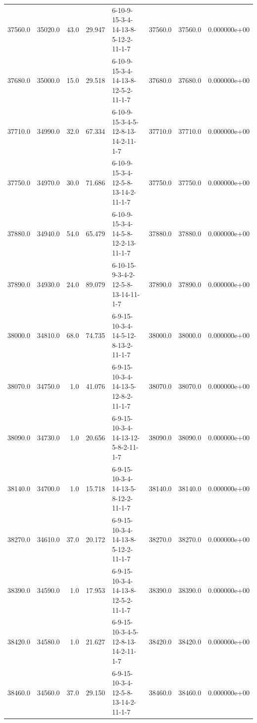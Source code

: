 \begin{tabular}{rrrrlrrr}
 37560.0 &  35020.0 &           43.0 &             29.947 &  6-10-9-15-3-4-14-13-8-5-12-2-11-1-7 &       37560.0 &         37560.0 &  0.000000e+00 \\
 37680.0 &  35000.0 &           15.0 &             29.518 &  6-10-9-15-3-4-14-13-8-12-5-2-11-1-7 &       37680.0 &         37680.0 &  0.000000e+00 \\
 37710.0 &  34990.0 &           32.0 &             67.334 &  6-10-9-15-3-4-5-12-8-13-14-2-11-1-7 &       37710.0 &         37710.0 &  0.000000e+00 \\
 37750.0 &  34970.0 &           30.0 &             71.686 &  6-10-9-15-3-4-12-5-8-13-14-2-11-1-7 &       37750.0 &         37750.0 &  0.000000e+00 \\
 37880.0 &  34940.0 &           54.0 &             65.479 &  6-10-9-15-3-4-14-5-8-12-2-13-11-1-7 &       37880.0 &         37880.0 &  0.000000e+00 \\
 37890.0 &  34930.0 &           24.0 &             89.079 &  6-10-15-9-3-4-2-12-5-8-13-14-11-1-7 &       37890.0 &         37890.0 &  0.000000e+00 \\
 38000.0 &  34810.0 &           68.0 &             74.735 &  6-9-15-10-3-4-14-5-12-8-13-2-11-1-7 &       38000.0 &         38000.0 &  0.000000e+00 \\
 38070.0 &  34750.0 &            1.0 &             41.076 &  6-9-15-10-3-4-14-13-5-12-8-2-11-1-7 &       38070.0 &         38070.0 &  0.000000e+00 \\
 38090.0 &  34730.0 &            1.0 &             20.656 &  6-9-15-10-3-4-14-13-12-5-8-2-11-1-7 &       38090.0 &         38090.0 &  0.000000e+00 \\
 38140.0 &  34700.0 &            1.0 &             15.718 &  6-9-15-10-3-4-14-13-5-8-12-2-11-1-7 &       38140.0 &         38140.0 &  0.000000e+00 \\
 38270.0 &  34610.0 &           37.0 &             20.172 &  6-9-15-10-3-4-14-13-8-5-12-2-11-1-7 &       38270.0 &         38270.0 &  0.000000e+00 \\
 38390.0 &  34590.0 &            1.0 &             17.953 &  6-9-15-10-3-4-14-13-8-12-5-2-11-1-7 &       38390.0 &         38390.0 &  0.000000e+00 \\
 38420.0 &  34580.0 &            1.0 &             21.627 &  6-9-15-10-3-4-5-12-8-13-14-2-11-1-7 &       38420.0 &         38420.0 &  0.000000e+00 \\
 38460.0 &  34560.0 &           37.0 &             29.150 &  6-9-15-10-3-4-12-5-8-13-14-2-11-1-7 &       38460.0 &         38460.0 &  0.000000e+00 \\

\end{tabular}
